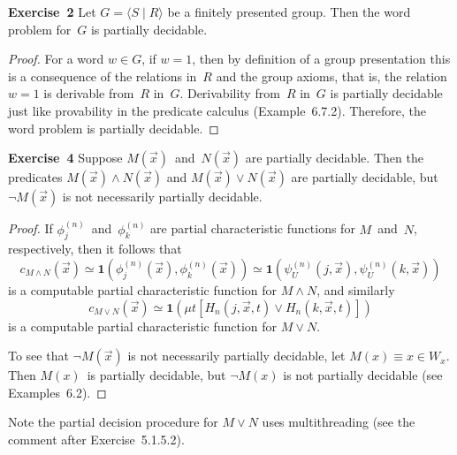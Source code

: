 \documentclass[letterpaper]{article}
\newcommand{\exercise}[2][]{\noindent\textbf{Exercise~{#2}}\ifthenelse{\isempty{#1}}{\textbf{.}}{ ({#1})\textbf{.}}}
\theoremstyle{plain}
\theoremstyle{definition}
\theoremstyle{remark}
\begin{document}
\exercise{2}
Let $G=\langle S\mid R\rangle$ be a finitely presented group. Then the word problem for~$G$ is partially decidable.
\begin{proof}
For a word $w\in G$, if $w=1$, then by definition of a group presentation this is a consequence of the relations in~$R$ and the group axioms, that is, the relation $w=1$ is derivable from~$R$ in~$G$. Derivability from~$R$ in~$G$ is partially decidable just like provability in the predicate calculus (Example~6.7.2). Therefore, the word problem is partially decidable.
\end{proof}

\exercise{4}
Suppose $M(\vec{x})$~and~$N(\vec{x})$ are partially decidable. Then the predicates $M(\vec{x})\land N(\vec{x})$ and $M(\vec{x})\lor N(\vec{x})$ are partially decidable, but $\lnot M(\vec{x})$ is not necessarily partially decidable.
\begin{proof}
If $\phi_j^{(n)}$~and~$\phi_k^{(n)}$ are partial characteristic functions for $M$~and~$N$, respectively, then it follows that
$$c_{M\land N}(\vec{x})\simeq\mathbf{1}(\phi_j^{(n)}(\vec{x}),\phi_k^{(n)}(\vec{x}))\simeq\mathbf{1}(\psi_U^{(n)}(j,\vec{x}),\psi_U^{(n)}(k,\vec{x}))$$
is a computable partial characteristic function for $M\land N$, and similarly
$$c_{M\lor N}(\vec{x})\simeq\mathbf{1}(\mu t[H_n(j,\vec{x},t)\lor H_n(k,\vec{x},t)])$$
is a computable partial characteristic function for $M\lor N$.

To see that $\lnot M(\vec{x})$ is not necessarily partially decidable, let $M(x)\equiv x\in W_x$. Then $M(x)$~is partially decidable, but $\lnot M(x)$ is not partially decidable (see Examples~6.2).
\end{proof}
\noindent Note the partial decision procedure for $M\lor N$ uses multithreading (see the comment after Exercise~5.1.5.2).
\end{document}
